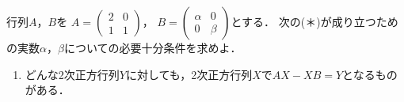 \documentclass[../../main.tex]{subfiles}
\begin{document}
行列$A$，$B$を
$A=
\begin{pmatrix} 2 & 0 \\ 1 & 1
\end{pmatrix}$，
$B=
\begin{pmatrix} \alpha & 0 \\ 0 & \beta
\end{pmatrix}$とする．
次の(＊)が成り立つための実数$\alpha$，$\beta$についての必要十分条件を求めよ．
\begin{enumerate}
  \item[(＊)]どんな2次正方行列$Y$に対しても，2次正方行列$X$で$AX-XB=Y$となるものがある．
\end{enumerate}
\end{document}
